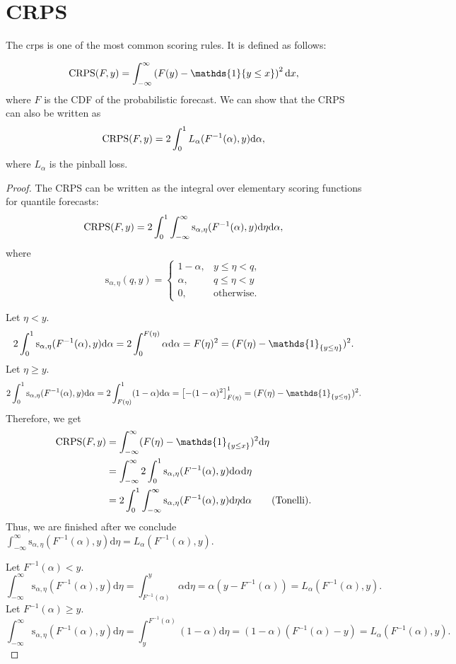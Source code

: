 \section{CRPS}
\label{ch:crps}

\renewcommand{\d}{\mathrm{d}}

The \gls{crps} is one of the most common 
scoring rules. It is defined as follows: 

\[ \CRPS(F, y) = \int_{-\infty}^\infty \left( F(y) - \mathds{1} \{y \leq x\} \right)^2 \d x, \]
where \(F\) is the CDF of the probabilistic forecast.
We can show that the CRPS can also be written as 
\[ \CRPS(F, y) = 2 \int_0^1 L_\alpha(F^{-1}(\alpha), y) \d \alpha, \]
where \(L_\alpha\) is the pinball loss.
\begin{proof}
    The CRPS can be written as the integral over elementary scoring functions for quantile forecasts: 
    \[ \CRPS(F, y) = 2 \int_0^1 \int_{-\infty}^\infty \mathrm{s}_{\alpha, \eta}(F^{-1}(\alpha), y) \d \eta \d \alpha, \]
    where 
    \[ \mathrm{s}_{\alpha, \eta}(q, y) = \begin{cases}
        1-\alpha, &y\leq \eta < q, \\
        \alpha, &q\leq \eta < y \\
        0, &\text{otherwise}.
    \end{cases} \]

    Let \(\eta < y\). 
    \[ 2 \int_0^1 \mathrm{s}_{\alpha, \eta}(F^{-1}(\alpha), y) \d\alpha = 2 \int_0^{F(\eta)} \alpha \d \alpha = F(\eta)^2 = (F(\eta) - \mathds{1}_{\set{y \leq \eta}})^2. \]
    Let \(\eta \geq y\).
    \[ 2 \int_0^1 \mathrm{s}_{\alpha, \eta}(F^{-1}(\alpha), y) \d\alpha = 2 \int_{F(\eta)}^1 (1-\alpha) \d\alpha = \left[ - (1-\alpha)^2 \right]_{F(\eta)}^1 = (F(\eta) - \mathds{1}_{\set{y \leq \eta}})^2. \]
    Therefore, we get 
    \begin{align*}
        \CRPS(F, y) &= \int_{-\infty}^\infty (F(\eta) - \mathds{1}_{\set{y\leq x}})^2 \d \eta \\
        &= \int_{-\infty}^\infty 2 \int_0^1 \mathrm{s}_{\alpha, \eta}(F^{-1}(\alpha), y) \d \alpha \d \eta \\
        &= 2\int_0^1 \int_{-\infty}^\infty \mathrm{s}_{\alpha, \eta}(F^{-1}(\alpha), y) \d \eta \d \alpha  \tag{Tonelli}.
    \end{align*}
    Thus, we are finished after we conclude \(\int_{-\infty}^\infty \mathrm{s}_{\alpha, \eta}(F^{-1}(\alpha), y) \d \eta = L_\alpha(F^{-1}(\alpha), y)\).

    Let \(F^{-1}(\alpha) < y\). 
    \[ \int_{-\infty}^\infty \mathrm{s}_{\alpha, \eta}(F^{-1}(\alpha), y) \d \eta = \int_{F^{-1}(\alpha)}^y \alpha \d \eta = \alpha (y - F^{-1}(\alpha)) = L_\alpha(F^{-1}(\alpha), y). \]
    Let \(F^{-1}(\alpha) \geq y\). 
    \[ \int_{-\infty}^\infty \mathrm{s}_{\alpha, \eta}(F^{-1}(\alpha), y) \d \eta = \int_y^{F^{-1}(\alpha)} (1-\alpha) \d \eta = (1-\alpha) (F^{-1}(\alpha) - y) = L_\alpha(F^{-1}(\alpha), y). \]
\end{proof}